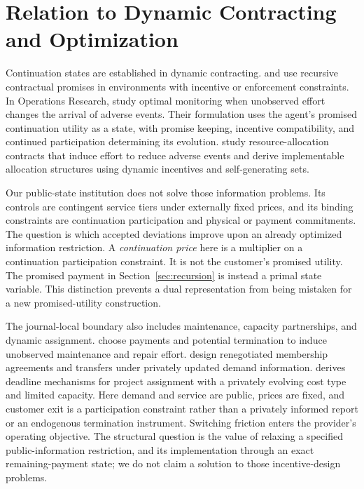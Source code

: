 \documentclass[11pt,letterpaper]{article}
\theoremstyle{definition}\newtheorem{assumption}[theorem]{Assumption}
\begin{document}
\section{Relation to Dynamic Contracting and Optimization}\label{sec:literature}
Continuation states are established in dynamic contracting. \citet{SpearSrivastava1987} and \citet{ThomasWorrall1988} use recursive contractual promises in environments with incentive or enforcement constraints. In Operations Research, \citet{ChenSunXiao2020} study optimal monitoring when unobserved effort changes the arrival of adverse events. Their formulation uses the agent's promised continuation utility as a state, with promise keeping, incentive compatibility, and continued participation determining its evolution. \citet{LiangSunTangZhang2023} study resource-allocation contracts that induce effort to reduce adverse events and derive implementable allocation structures using dynamic incentives and self-generating sets.

Our public-state institution does not solve those information problems. Its controls are contingent service tiers under externally fixed prices, and its binding constraints are continuation participation and physical or payment commitments. The question is which accepted deviations improve upon an already optimized information restriction. A \emph{continuation price} here is a multiplier on a continuation participation constraint. It is not the customer's promised utility. The promised payment in Section~\ref{sec:recursion} is instead a primal state variable. This distinction prevents a dual representation from being mistaken for a new promised-utility construction.

The journal-local boundary also includes maintenance, capacity partnerships, and dynamic assignment. \citet{TianSunDuenyas2021} choose payments and potential termination to induce unobserved maintenance and repair effort. \citet{LiuLewisSongKuribko2019} design renegotiated membership agreements and transfers under privately updated demand information. \citet{He2023} derives deadline mechanisms for project assignment with a privately evolving cost type and limited capacity. Here demand and service are public, prices are fixed, and customer exit is a participation constraint rather than a privately informed report or an endogenous termination instrument. Switching friction enters the provider's operating objective. The structural question is the value of relaxing a specified public-information restriction, and its implementation through an exact remaining-payment state; we do not claim a solution to those incentive-design problems.
\end{document}
